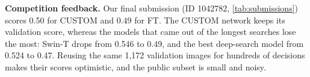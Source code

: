 \textbf{Competition feedback.} Our final submission (ID 1042782, \cref{tab:submissions}) scores 0.50 for CUSTOM and 0.49 for FT. The CUSTOM network keeps its validation score, whereas the models that came out of the longest searches lose the most: Swin-T drops from 0.546 to 0.49, and the best deep-search model from 0.524 to 0.47. Reusing the same 1,172 validation images for hundreds of decisions makes their scores optimistic, and the public subset is small and noisy.
